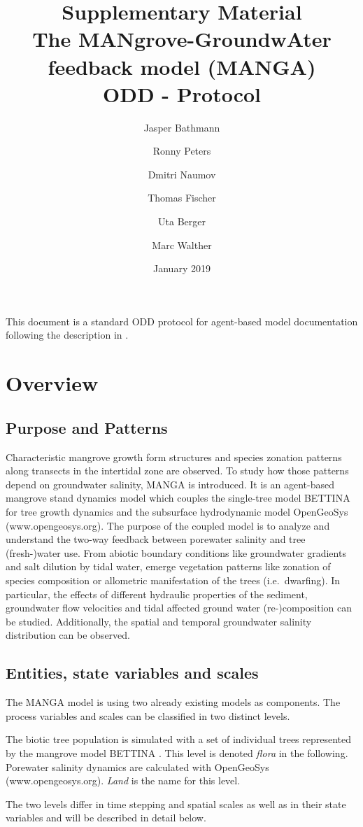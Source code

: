 \documentclass[manusscript, 12p, authoryear]{elsarticle}
\title{Supplementary Material\\The MANgrove-GroundwAter feedback model (MANGA) \\ ODD - Protocol}
\author[1,2]{Jasper Bathmann\corref{cor1}%
}
\author[3]{Ronny Peters}
\author[1]{Dmitri Naumov}
\author[1]{Thomas Fischer}
\author[3]{Uta Berger}
\author[1,2]{Marc Walther}
\date{January 2019}                                           %
\begin{document}
\maketitle 
This document is a standard ODD protocol for agent-based model documentation following the description in \citet{Grimm2020}.
\tableofcontents
\section{Overview}
\subsection{Purpose and Patterns}
Characteristic mangrove growth form structures and species zonation patterns along transects in the intertidal zone are observed. 
To study how those patterns depend on groundwater salinity, MANGA is introduced.
It is an agent-based mangrove stand dynamics model which couples the single-tree model BETTINA \citep{Ronny2014} for tree growth dynamics and the subsurface hydrodynamic model OpenGeoSys (www.opengeosys.org).
The purpose of the coupled model is to analyze and understand the two-way feedback between porewater salinity and tree (fresh-)water use.
From abiotic boundary conditions like groundwater gradients and salt dilution by tidal water, emerge vegetation patterns like zonation of species composition or allometric manifestation of the trees (i.e.~dwarfing).
In particular, the effects of different hydraulic properties of the sediment, groundwater flow velocities and tidal affected ground water (re-)composition can be studied.
Additionally, the spatial and temporal groundwater salinity distribution can be observed.



\subsection{Entities, state variables and scales}
The MANGA model is using two already existing models as components.
The process variables and scales can be classified in two distinct levels.

The biotic tree population is simulated with a set of individual trees represented by the mangrove model BETTINA \citep{Ronny2014}.
This level is denoted \textit{flora} in the following.
Porewater salinity dynamics are calculated with OpenGeoSys (www.opengeosys.org).
\textit{Land} is the name for this level.

The two levels differ in time stepping and spatial scales as well as in their state variables and will be described in detail below.
\end{document}
